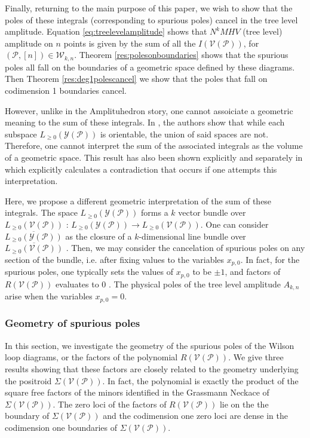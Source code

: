 \documentclass[11pt]{article}
\newcommand{\cP}{\mathcal{P}}
\newcommand{\cV}{\mathcal{V}}
\newcommand{\cY}{\mathcal{Y}}
\newcommand{\VP}{\cV(\cP)}
\newcommand{\YP}{\cY(\cP)}
\newcommand{\Lpos}{L_{\geq 0}}
\newcommand{\cW}{\mathcal{W}}
\theoremstyle{remark}
\theoremstyle{definition}
\begin{document}
Finally, returning to the main purpose of this paper, we wish to show that  the poles of these integrals (corresponding to spurious poles) cancel in the tree level amplitude. Equation \eqref{eq:treelevelamplitude} shows that $N^kMHV$ (tree level) amplitude on $n$ points is given by the sum of all the $I(\VP)$, for $(\cP, [n]) \in \cW_{k,n}$. Theorem \ref{res:polesonboundaries} shows that the spurious poles all fall on the boundaries of a geometric space defined by these diagrams. Then Theorem \ref{res:deg1polescancel} we show that the poles that fall on codimension 1 boundaries cancel.

However, unlike in the Amplituhedron story, one cannot assoiciate a geometric meaning to the sum of these integrals. In \cite{non-orientable}, the authors show that while each subspace $\Lpos(\YP)$ is orientable, the union of said spaces are not. Therefore, one cannot interpret the sum of the associated integrals as the volume of a geometric space. This result has also been shown explicitly and separately in \cite{HeslopStewart} which explicitly calculates a contradiction that occurs if one attempts this interpretation.

Here, we propose a different geometric interpretation of the sum of these integrals. The space $\Lpos(\YP)$ forms a $k$ vector bundle over $\Lpos(\VP)$ \cite{non-orientable}: $\Lpos(\YP) \rightarrow \Lpos(\VP)$. One can consider $\overline{\Lpos(\YP)}$ as the closure of a $k$-dimensional line bundle over $\overline{\Lpos(\VP)}$ \cite{non-orientable}. Then, we may consider the cancelation of spurious poles on any section of the bundle, i.e. after fixing values to the variables $x_{p, 0}$. In fact, for the spurious poles, one typically sets the values of $x_{p,0}$ to be $\pm 1$, and factors of $R(\VP)$ evaluates to $0$ \cite{??}. The physical poles of the tree level amplitude $A_{k,n}$ arise when the variables $x_{p, 0} = 0$. 


\subsubsection{Geometry of spurious poles}

In this section, we investigate the geometry of the spurious poles of the Wilson loop diagrams, or the factors of the polynomial $R(\VP)$. We give three results showing that these factors are closely related to the geometry underlying the positroid $\Sigma(\VP)$. In fact, the polynomial is exactly the product of the square free factors of the minors identified in the Grassmann Neckace of $\Sigma(\VP)$. The zero loci of the factors of $R(\VP)$ lie on the the boundary of $\Sigma(\VP)$ and the codimension one zero loci are dense in the codimension one boundaries of $\Sigma(\VP)$. 
\end{document}

